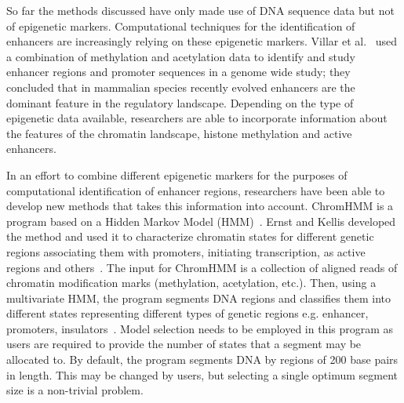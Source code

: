         

        

        So far the methods discussed have only made use of DNA sequence data but not of epigenetic markers. 
        Computational techniques for the identification of enhancers are increasingly relying on these epigenetic markers. Villar et al.~\cite{villar2015enhancer} used a combination of methylation and acetylation data to identify and study enhancer regions and promoter sequences in a genome wide study; they concluded that in mammalian species recently evolved enhancers are the dominant feature in the regulatory landscape. Depending on the type of epigenetic data available, researchers are able to incorporate information about the features of the chromatin landscape, histone methylation and active enhancers. 
        
        In an effort to combine different epigenetic markers for the purposes of computational identification of enhancer regions, researchers have been able to develop new methods that takes this information into account. ChromHMM is a program based on a Hidden Markov Model (HMM)~\cite{mesa2016hidden}. Ernst and Kellis developed the method and used it to characterize chromatin states for different genetic regions associating them with promoters, initiating transcription, as active regions and others~\cite{ernst2010discovery}. The input for ChromHMM is a collection of aligned reads of chromatin modification marks (methylation, acetylation, etc.). Then, using a multivariate HMM, the program segments DNA regions and classifies them into different states representing different types of genetic regions e.g. enhancer, promoters, insulators~\cite{ernst2012chromhmm}. Model selection needs to be employed in this program as users are required to provide the number of states that a segment may be allocated to. By default, the program segments DNA by regions of 200 base pairs in length. This may be changed by users, but selecting a single optimum segment size is a non-trivial problem. 
        
